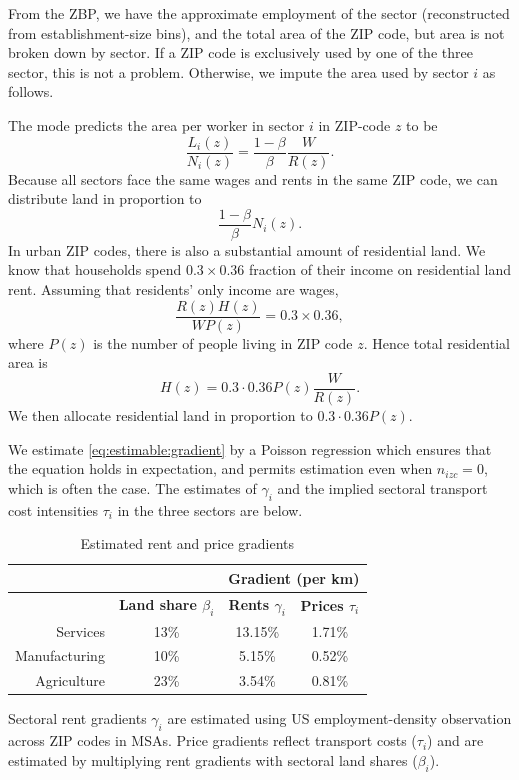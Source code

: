 \documentclass[12pt]{article}
\begin{document}
From the ZBP, we have the approximate employment of the sector (reconstructed from establishment-size bins), and the total area of the ZIP code, but area is not broken down by sector. If a ZIP code is exclusively used by one of the three sector, this is not a problem. Otherwise, we impute the area used by sector $i$ as follows.

The mode predicts the area per worker in sector $i$ in ZIP-code $z$ to be
\[
\frac{L_i(z)}{N_i(z)} = \frac{1-\beta}{\beta}\frac{W}{R(z)}.
\]
Because all sectors face the same wages and rents in the same ZIP code, we can distribute land in proportion to
\[
\frac{1-\beta}{\beta}N_i(z).
\]
In urban ZIP codes, there is also a substantial amount of residential land. We know that households spend $0.3\times 0.36$ fraction of their income on residential land rent. Assuming that residents' only income are wages,
\[
\frac{R(z)H(z)}{WP(z)} = 0.3\times 0.36,
\]
where $P(z)$ is the number of people living in ZIP code $z$. Hence total residential area is
\[
H(z) = 0.3\cdot0.36 P(z) \frac{W}{R(z)}.
\]
We then allocate residential land in proportion to $0.3\cdot0.36 P(z)$.

We estimate \eqref{eq:estimable:gradient} by a Poisson regression which ensures that the equation holds in expectation, and permits estimation even when $n_{izc}=0$, which is often the case. The estimates of $\gamma_i$ and the implied sectoral transport cost intensities $\tau_i$ in the three sectors are below.

\begin{table}[h!]
  \begin{center}
  \caption{Estimated rent and price gradients}
    \begin{tabular}{rccc}
    \toprule
    \textbf{} & \textbf{} & \multicolumn{2}{c}{\textbf{Gradient (per km)}}\\
    \midrule
    \textbf{} & \textbf{Land share $\beta_i$ } & \textbf{Rents $\gamma_i$} & \textbf{Prices $\tau_i$} \\
    Services & 13\%  & 13.15\% & 1.71\% \\
    Manufacturing & 10\%  & 5.15\% & 0.52\% \\
    Agriculture & 23\%  & 3.54\% & 0.81\% \\
    \bottomrule
    \end{tabular}%

  \end{center}
  \label{tab:EmpGrad}%

  \noindent \footnotesize{Sectoral rent gradients $\gamma_i$ are estimated using US employment-density observation across ZIP codes in MSAs. Price gradients reflect transport costs ($\tau_i$) and are estimated by multiplying rent gradients with sectoral land shares ($\beta_i$). }
\end{table}%
\end{document}
